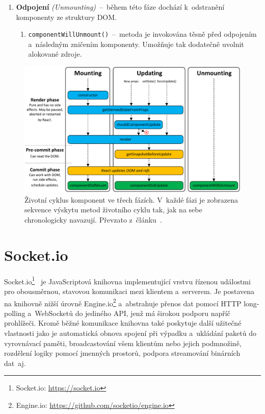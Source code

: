\begin{enumerate}
    \item \textbf{Odpojení} \emph{(Unmounting)}~--~během této fáze dochází k~odstranění komponenty ze struktury DOM.
    \begin{enumerate}
        \item \texttt{componentWillUnmount()}~--~metoda je invokována těsně před odpojením a~následným zničením komponenty. Umožňuje tak dodatečně uvolnit alokované zdroje.
    \end{enumerate}
\end{enumerate}

\begin{figure}[hbt]
	\centering
	\setlength{\fboxsep}{0pt}
	\includegraphics[width=1.0\textwidth]{obrazky-figures/ReactComponentLifecycle.pdf}
	\caption{Životní cyklus komponent ve třech fázích. V~každé fázi je zobrazena sekvence výskytu metod životního cyklu tak, jak na sebe chronologicky navazují. Převzato z~článku~\cite{website:ReactComponentsLifecycle}.}
	\label{img:ReactComponentLifecycle}
\end{figure}

\section{Socket.io}
\label{sec:SocketIO}
Socket.io\footnote{Socket.io: \url{https://socket.io}}~\cite{manual:SocketIO} je JavaScriptová knihovna implementující vrstvu řízenou událostmi pro obousměrnou, stavovou komunikaci mezi klientem a~serverem. Je postavena na knihovně nižší úrovně Engine.io\footnote{Engine.io: \url{https://github.com/socketio/engine.io}} a~abstrahuje přenos dat pomocí HTTP long-polling a~WebSocketů do jediného API, jenž má širokou podporu napříč prohlížeči. Kromě běžné komunikace knihovna také poskytuje další užitečné vlastnosti jako je automatická obnova spojení při výpadku a~ukládání paketů do vyrovnávací paměti, broadcastování všem klientům nebo jejich podmnožině, rozdělení logiky pomocí jmenných prostorů, podpora streamování binárních dat~aj.

